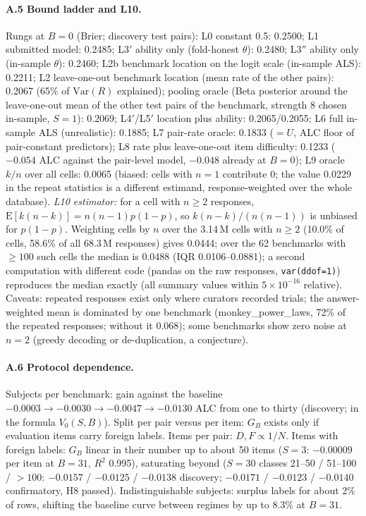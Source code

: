 \documentclass{article}
\begin{document}
\paragraph{A.5 Bound ladder and L10.} Rungs at $B = 0$ (Brier; discovery test pairs): L0 constant 0.5: 0.2500; L1
submitted model: 0.2485; L3$'$ ability only (fold-honest $\theta$): 0.2480; L3$''$ ability only (in-sample $\theta$):
0.2460; L2b benchmark location on the logit scale (in-sample ALS): 0.2211; L2 leave-one-out benchmark location (mean
rate of the other pairs): 0.2067 (65\% of $\mathrm{Var}(R)$ explained); pooling oracle (Beta
posterior around the leave-one-out mean of the other test pairs of the benchmark, strength 8 chosen in-sample, $S = 1$): 0.2069; L4$'$/L5$'$ location plus ability: 0.2065/0.2055;
L6 full in-sample ALS (unrealistic): 0.1885; L7 pair-rate oracle: 0.1833 ($= U$, ALC floor of pair-constant
predictors); L8 rate plus leave-one-out item difficulty: 0.1233 ($-0.054$ ALC against the pair-level model, $-0.048$
already at $B = 0$); L9 oracle $k/n$ over all cells: 0.0065 (biased: cells with $n = 1$ contribute 0; the value 0.0229
in the repeat statistics is a different estimand, response-weighted over the whole database). \emph{L10 estimator:} for
a cell with $n \ge 2$ responses, $\mathrm{E}[k(n-k)] = n(n-1)p(1-p)$, so $k(n-k)/(n(n-1))$ is unbiased for $p(1-p)$.
Weighting cells by $n$ over the 3.14\,M cells with $n \ge 2$ (10.0\% of cells, 58.6\% of all 68.3\,M responses) gives
0.0444; over the 62 benchmarks with $\ge 100$ such cells the median is 0.0488 (IQR 0.0106--0.0881); a second
computation with different code (pandas on the raw responses, \texttt{var(ddof=1)}) reproduces the median exactly
(all summary values within $5\times10^{-16}$ relative). Caveats: repeated responses exist only where curators recorded trials; the answer-weighted
mean is dominated by one benchmark (monkey\_power\_laws, 72\% of the repeated responses; without it 0.068); some benchmarks show zero noise at $n = 2$ (greedy decoding or
de-duplication, a conjecture).

\paragraph{A.6 Protocol dependence.} Subjects per benchmark: gain against the baseline $-0.0003 \to -0.0030 \to
-0.0047 \to -0.0130$ ALC from one to thirty (discovery; in the formula $V_0(S, B)$). Split per pair versus per item:
$G_B$ exists only if evaluation items carry foreign labels. Items per pair: $D, F \propto 1/N$. Items with foreign
labels: $G_B$ linear in their number up to about 50 items ($S = 3$: $-0.00009$ per item at $B = 31$, $R^2$ 0.995),
saturating beyond ($S = 30$ classes 21--50 / 51--100 / $>100$: $-0.0157$ / $-0.0125$ / $-0.0138$ discovery; $-0.0171$ /
$-0.0123$ / $-0.0140$ confirmatory, H8 passed). Indistinguishable subjects: surplus labels for about 2\% of rows, shifting the baseline curve between
regimes by up to 8.3\% at $B = 31$.
\end{document}
